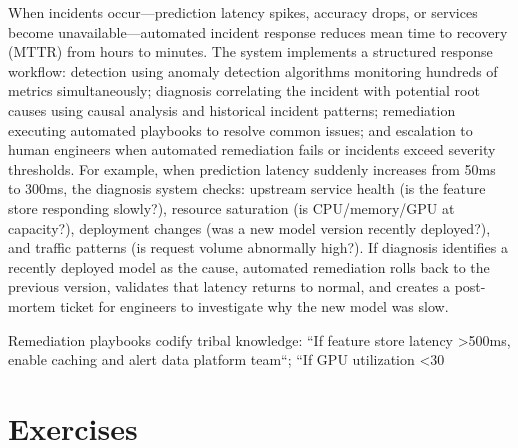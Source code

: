 When incidents occur---prediction latency spikes, accuracy drops, or services become unavailable---automated incident response reduces mean time to recovery (MTTR) from hours to minutes. The system implements a structured response workflow: detection using anomaly detection algorithms monitoring hundreds of metrics simultaneously; diagnosis correlating the incident with potential root causes using causal analysis and historical incident patterns; remediation executing automated playbooks to resolve common issues; and escalation to human engineers when automated remediation fails or incidents exceed severity thresholds. For example, when prediction latency suddenly increases from 50ms to 300ms, the diagnosis system checks: upstream service health (is the feature store responding slowly?), resource saturation (is CPU/memory/GPU at capacity?), deployment changes (was a new model version recently deployed?), and traffic patterns (is request volume abnormally high?). If diagnosis identifies a recently deployed model as the cause, automated remediation rolls back to the previous version, validates that latency returns to normal, and creates a post-mortem ticket for engineers to investigate why the new model was slow.

Remediation playbooks codify tribal knowledge: ``If feature store latency >500ms, enable caching and alert data platform team``; ``If GPU utilization <30%

\section{Exercises}

